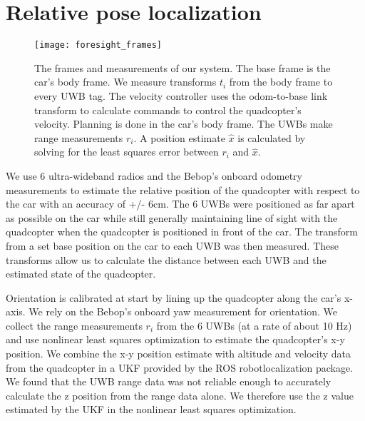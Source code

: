
\section{Relative pose localization}

\begin{figure}
  \centering
    \texttt{[image: foresight\_frames]}
  \caption{The frames and measurements of our system. The base frame
   is the car's body frame. We measure transforms $t_{i}$ from the body
   frame to every UWB tag. The velocity controller uses the odom-to-base\textunderscore 
   link transform to calculate commands to control the quadcopter's velocity.
   Planning is done in the car's body frame.
   The UWBs make range measurements $r_{i}$. A position estimate $\hat{x}$
   is calculated by solving for the least squares error between $r_{i}$ and $\hat{x}$.}
  \label{fig:frames}
\end{figure}

We use 6 ultra-wideband radios and the Bebop's onboard odometry measurements
to estimate the relative position of the quadcopter with respect to the car with an
accuracy of +/- 6cm. The 6 UWBs were positioned as far apart as possible on the
car while still generally maintaining line of sight with the quadcopter when the
quadcopter is positioned in front of the car. The transform from a set base position
on the car to each UWB was then measured. These transforms allow us to
calculate the distance between each UWB and the estimated state of the quadcopter.

Orientation is calibrated at start by lining up the quadcopter along the car's x-axis.
We rely on the Bebop's onboard yaw measurement for orientation.
We collect the range measurements $r_{i}$ from the 6 UWBs (at a rate of about 10 Hz)
and use nonlinear least squares optimization to estimate the quadcopter's x-y position. 
We combine the x-y position estimate with altitude and velocity data from the quadcopter in
a UKF provided by the ROS robot\textunderscore localization package.  We found that
the UWB range data was not reliable enough to accurately calculate the z position
from the range data alone. We therefore use the z value estimated by the UKF in
the nonlinear least squares optimization.